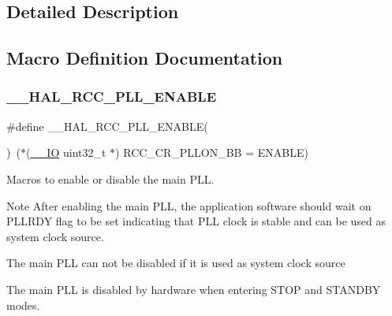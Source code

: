 \subsection{Detailed Description}


\subsection{Macro Definition Documentation}
\mbox{\label{group___r_c_c___p_l_l___configuration_gaaf196a2df41b0bcbc32745c2b218e696}} 
\subsubsection{\texorpdfstring{\+\_\+\+\_\+\+H\+A\+L\+\_\+\+R\+C\+C\+\_\+\+P\+L\+L\+\_\+\+E\+N\+A\+B\+LE}{\_\_HAL\_RCC\_PLL\_ENABLE}}
{\footnotesize\ttfamily \#define \+\_\+\+\_\+\+H\+A\+L\+\_\+\+R\+C\+C\+\_\+\+P\+L\+L\+\_\+\+E\+N\+A\+B\+LE(\begin{DoxyParamCaption}{ }\end{DoxyParamCaption})~($\ast$(\mbox{\hyperlink{core__sc300_8h_aec43007d9998a0a0e01faede4133d6be}{\+\_\+\+\_\+\+IO}} uint32\+\_\+t $\ast$) R\+C\+C\+\_\+\+C\+R\+\_\+\+P\+L\+L\+O\+N\+\_\+\+BB = E\+N\+A\+B\+LE)}



Macros to enable or disable the main P\+LL. 

\begin{DoxyNote}{Note}
After enabling the main P\+LL, the application software should wait on P\+L\+L\+R\+DY flag to be set indicating that P\+LL clock is stable and can be used as system clock source. 

The main P\+LL can not be disabled if it is used as system clock source 

The main P\+LL is disabled by hardware when entering S\+T\+OP and S\+T\+A\+N\+D\+BY modes. 
\end{DoxyNote}
\mbox{\label{group___r_c_c___p_l_l___configuration_gabca62f581e6c2553cca7ef0d7a2a4b7f}} 
